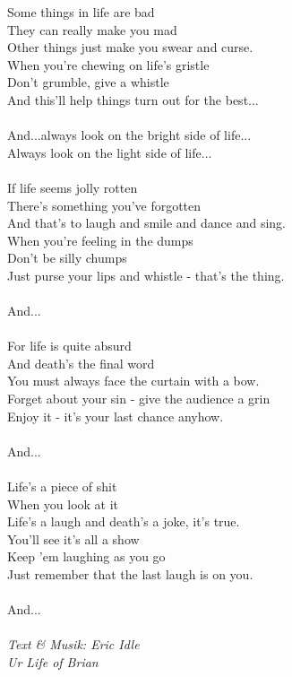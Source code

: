\vspace{10pt}
Some things in life are bad\\
They can really make you mad\\
Other things just make you swear and curse.\\
When you're chewing on life's gristle\\
Don't grumble, give a whistle\\
And this'll help things turn out for the best...\\
\\
And...always look on the bright side of life...\\
Always look on the light side of life...\\
\\
If life seems jolly rotten\\
There's something you've forgotten\\
And that's to laugh and smile and dance and sing.\\
When you're feeling in the dumps\\
Don't be silly chumps\\
Just purse your lips and whistle - that's the thing.\\
\\
And...\\
\\
For life is quite absurd\\
And death's the final word\\
You must always face the curtain with a bow.\\
Forget about your sin - give the audience a grin\\
Enjoy it - it's your last chance anyhow.\\
\\
And...\\
\\
Life's a piece of shit\\
When you look at it\\
Life's a laugh and death's a joke, it's true.\\
You'll see it's all a show\\
Keep 'em laughing as you go\\
Just remember that the last laugh is on you.\\
\\
And...\\
\\
{\footnotesize\textit{Text \& Musik: Eric Idle \\ Ur Life of Brian}}
